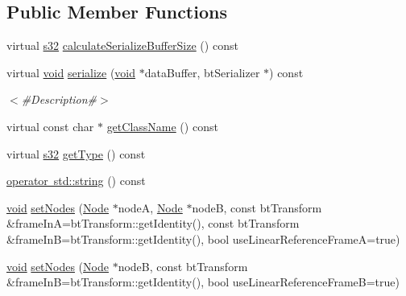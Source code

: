 \subsection*{Public Member Functions}
\begin{DoxyCompactItemize}
\item 
virtual \mbox{\hyperlink{_util_8h_aa62c75d314a0d1f37f79c4b73b2292e2}{s32}} \mbox{\hyperlink{classnjli_1_1_physics_constraint_generic6_dof_spring_a2d22369c72fba1c3a477251c14273a2e}{calculate\+Serialize\+Buffer\+Size}} () const
\item 
virtual \mbox{\hyperlink{_thread_8h_af1e856da2e658414cb2456cb6f7ebc66}{void}} \mbox{\hyperlink{classnjli_1_1_physics_constraint_generic6_dof_spring_a8d00ec82407e32449b1e9016c13ca301}{serialize}} (\mbox{\hyperlink{_thread_8h_af1e856da2e658414cb2456cb6f7ebc66}{void}} $\ast$data\+Buffer, bt\+Serializer $\ast$) const
\begin{DoxyCompactList}\small\item\em $<$\#\+Description\#$>$ \end{DoxyCompactList}\item 
virtual const char $\ast$ \mbox{\hyperlink{classnjli_1_1_physics_constraint_generic6_dof_spring_a8a44bad32336f595195ccfa836a91068}{get\+Class\+Name}} () const
\item 
virtual \mbox{\hyperlink{_util_8h_aa62c75d314a0d1f37f79c4b73b2292e2}{s32}} \mbox{\hyperlink{classnjli_1_1_physics_constraint_generic6_dof_spring_a2fecef82051a7d6f1a51a81ca5621798}{get\+Type}} () const
\item 
\mbox{\hyperlink{classnjli_1_1_physics_constraint_generic6_dof_spring_a5ac3c1339170b7f94c3cb32cdd1d33ca}{operator std\+::string}} () const
\item 
\mbox{\hyperlink{_thread_8h_af1e856da2e658414cb2456cb6f7ebc66}{void}} \mbox{\hyperlink{classnjli_1_1_physics_constraint_generic6_dof_spring_afe3cd6485847535d9f02c35f289113fd}{set\+Nodes}} (\mbox{\hyperlink{classnjli_1_1_node}{Node}} $\ast$nodeA, \mbox{\hyperlink{classnjli_1_1_node}{Node}} $\ast$nodeB, const bt\+Transform \&frame\+InA=bt\+Transform\+::get\+Identity(), const bt\+Transform \&frame\+InB=bt\+Transform\+::get\+Identity(), bool use\+Linear\+Reference\+FrameA=true)
\item 
\mbox{\hyperlink{_thread_8h_af1e856da2e658414cb2456cb6f7ebc66}{void}} \mbox{\hyperlink{classnjli_1_1_physics_constraint_generic6_dof_spring_a48675ca9439612df9cfb029216ec1e6f}{set\+Nodes}} (\mbox{\hyperlink{classnjli_1_1_node}{Node}} $\ast$nodeB, const bt\+Transform \&frame\+InB=bt\+Transform\+::get\+Identity(), bool use\+Linear\+Reference\+FrameB=true)

\end{DoxyCompactItemize}
